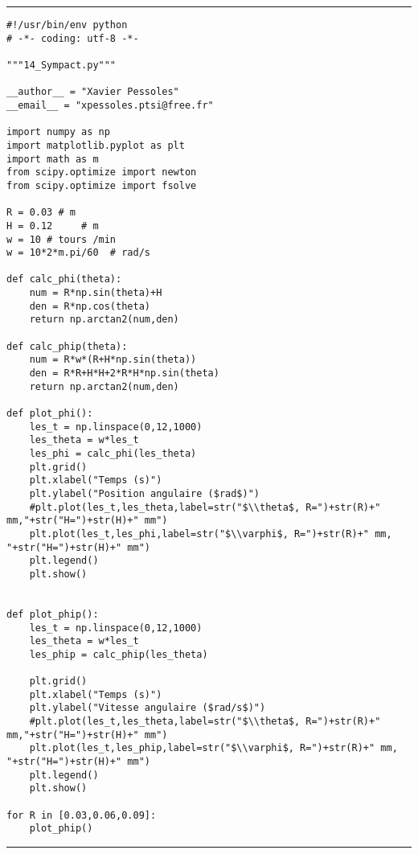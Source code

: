 \noindent\hrule
\begin{lstlisting}
#!/usr/bin/env python
# -*- coding: utf-8 -*-

"""14_Sympact.py"""

__author__ = "Xavier Pessoles"
__email__ = "xpessoles.ptsi@free.fr"

import numpy as np
import matplotlib.pyplot as plt
import math as m
from scipy.optimize import newton
from scipy.optimize import fsolve

R = 0.03 # m
H = 0.12     # m
w = 10 # tours /min
w = 10*2*m.pi/60  # rad/s

def calc_phi(theta):
    num = R*np.sin(theta)+H
    den = R*np.cos(theta)
    return np.arctan2(num,den)

def calc_phip(theta):
    num = R*w*(R+H*np.sin(theta))
    den = R*R+H*H+2*R*H*np.sin(theta)
    return np.arctan2(num,den)

def plot_phi():
    les_t = np.linspace(0,12,1000)
    les_theta = w*les_t
    les_phi = calc_phi(les_theta)
    plt.grid()
    plt.xlabel("Temps (s)")
    plt.ylabel("Position angulaire ($rad$)")
    #plt.plot(les_t,les_theta,label=str("$\\theta$, R=")+str(R)+" mm,"+str("H=")+str(H)+" mm")
    plt.plot(les_t,les_phi,label=str("$\\varphi$, R=")+str(R)+" mm, "+str("H=")+str(H)+" mm")
    plt.legend()
    plt.show()


def plot_phip():
    les_t = np.linspace(0,12,1000)
    les_theta = w*les_t
    les_phip = calc_phip(les_theta)
    
    plt.grid()
    plt.xlabel("Temps (s)")
    plt.ylabel("Vitesse angulaire ($rad/s$)")
    #plt.plot(les_t,les_theta,label=str("$\\theta$, R=")+str(R)+" mm,"+str("H=")+str(H)+" mm")
    plt.plot(les_t,les_phip,label=str("$\\varphi$, R=")+str(R)+" mm, "+str("H=")+str(H)+" mm")
    plt.legend()
    plt.show()

for R in [0.03,0.06,0.09]:
    plot_phip()
\end{lstlisting}
\noindent\hrule

\else
\fi


\ifprof
\else
\footnotesize
\ifcolle
\else
{}
\fi
\normalsize


\fi